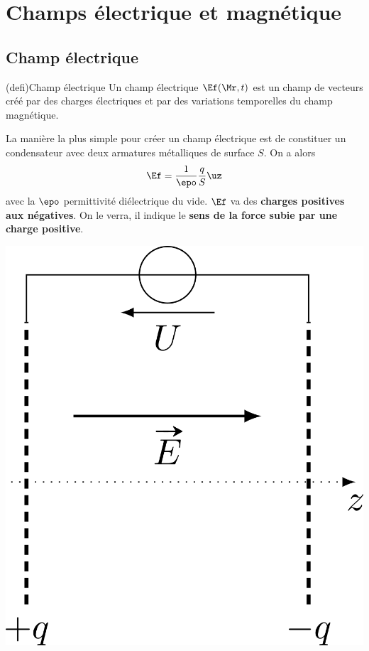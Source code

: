 \documentclass[../../main/main.tex]{subfiles}
\begin{document}
\section{Champs électrique et magnétique}
\subsection{Champ électrique}
\begin{tcb*}[sidebyside, righthand ratio=.3](defi){Champ électrique}
	Un champ électrique $\Ef(\Mr,t)$ est un champ de vecteurs créé par des
	charges électriques et par des variations temporelles du champ magnétique.
	\bigbreak
	\tcblower
	\vspace{-15pt}
\end{tcb*}

\noindent
\begin{minipage}{0.65\linewidth}
	La manière la plus simple pour créer un champ électrique est de constituer un
	condensateur avec deux armatures métalliques de surface $S$. On a alors
	\[\Ef = \frac{1}{\epo} \frac{q}{S}\uz\]
	avec la $\epo$ permittivité diélectrique du vide.
	\bigbreak
	$\Ef$ va des \textbf{charges positives aux négatives}. On le verra, il indique
	le \textbf{sens de la force subie par une charge positive}.
\end{minipage}
\hfill
\begin{minipage}{0.33\linewidth}
	\begin{center}
		\includegraphics[width=.7\linewidth]{condo_base}
		\captionsetup{justification=centering}
		\label{fig:condo}
	\end{center}
\end{minipage}
\end{document}
